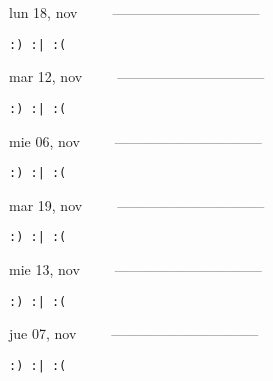 \documentclass[letterpaper,10pt]{article}
\begin{document}
\begin{multicols}{3}
{lun 18, nov\ \ \ \ \ --------------------------------}
\begin{flushright}\begin{small}\texttt{:) :| :(}\end{small}\end{flushright}
\vfill
{mar 12, nov\ \ \ \ \ --------------------------------}
\begin{flushright}\begin{small}\texttt{:) :| :(}\end{small}\end{flushright}\par
\vfill
{mie 06, nov\ \ \ \ \ --------------------------------}
\begin{flushright}\begin{small}\texttt{:) :| :(}\end{small}\end{flushright}\par
\vfill
\end{multicols}
\vspace{1.05cm}

\begin{multicols}{3}
{mar 19, nov\ \ \ \ \ --------------------------------}
\begin{flushright}\begin{small}\texttt{:) :| :(}\end{small}\end{flushright}
\vfill
{mie 13, nov\ \ \ \ \ --------------------------------}
\begin{flushright}\begin{small}\texttt{:) :| :(}\end{small}\end{flushright}\par
\vfill
{jue 07, nov\ \ \ \ \ --------------------------------}
\begin{flushright}\begin{small}\texttt{:) :| :(}\end{small}\end{flushright}\par
\vfill
\end{multicols}
\vspace{1.05cm}
\end{document}
